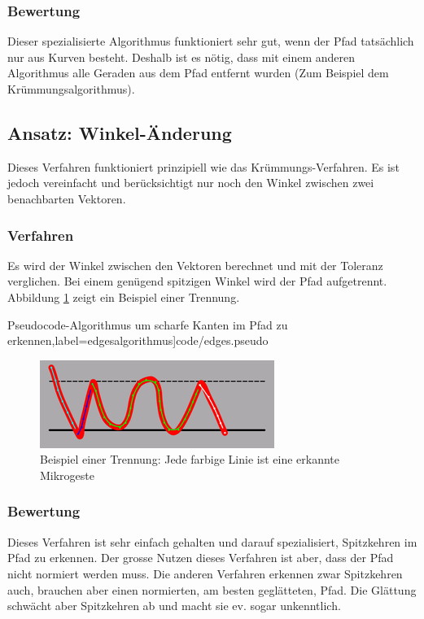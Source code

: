 \subsubsection{Bewertung}
Dieser spezialisierte Algorithmus funktioniert sehr gut, wenn der Pfad tatsächlich nur aus Kurven besteht. Deshalb ist es nötig, dass mit einem anderen Algorithmus alle Geraden aus dem Pfad entfernt wurden (Zum Beispiel dem Krümmungsalgorithmus).


\subsection{Ansatz: Winkel-Änderung}

Dieses Verfahren funktioniert prinzipiell wie das Krümmungs-Verfahren. Es ist jedoch vereinfacht und berücksichtigt nur noch den Winkel zwischen zwei benachbarten Vektoren.

\subsubsection{Verfahren}
Es wird der Winkel zwischen den Vektoren berechnet und mit der Toleranz verglichen. Bei einem genügend spitzigen Winkel wird der Pfad aufgetrennt. Abbildung \ref{kanten_trennung} zeigt ein Beispiel einer Trennung.

{Pseudocode-Algorithmus um scharfe Kanten im Pfad zu erkennen},label=edgesalgorithmus]{code/edges.pseudo}

\begin{figure}[h!]
  \centering
    \includegraphics[scale=0.75]{./img/edges_beispiel.png}
  \caption{Beispiel einer Trennung: Jede farbige Linie ist eine erkannte Mikrogeste}
  \label{kanten_trennung}
\end{figure}

\subsubsection{Bewertung}
Dieses Verfahren ist sehr einfach gehalten und darauf spezialisiert, Spitzkehren im Pfad zu erkennen. Der grosse Nutzen dieses Verfahren ist aber, dass der Pfad nicht normiert werden muss. Die anderen Verfahren erkennen zwar Spitzkehren auch, brauchen aber einen normierten, am besten geglätteten, Pfad. Die Glättung schwächt aber Spitzkehren ab und macht sie ev. sogar unkenntlich.  

